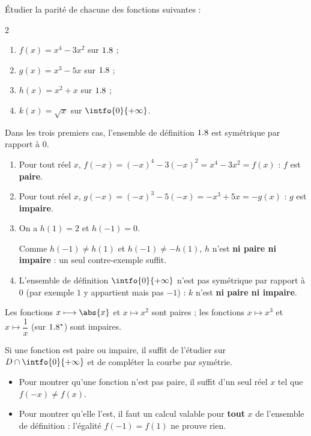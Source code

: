 \begin{methode}
	Étudier la parité de chacune des fonctions suivantes :
	\begin{multicols}{2}
		\begin{enumerate}
			\item $f(x) = x^4 - 3x^2$ sur $1.8$ ;
			\item $g(x) = x^3 - 5x$ sur $1.8$ ;
			\item $h(x) = x^2 + x$ sur $1.8$ ;
			\item $k(x) = \sqrt{x}$ sur $\intfo{0}{+\infty}$.
		\end{enumerate}
	\end{multicols}

	\begin{correction}
		Dans les trois premiers cas, l'ensemble de définition $1.8$ est symétrique par rapport à $0$.
		\begin{enumerate}
			\item Pour tout réel $x$, $f(-x) = (-x)^4 - 3(-x)^2 = x^4 - 3x^2 = f(x)$ : $f$ est \textbf{paire}.
			\item Pour tout réel $x$, $g(-x) = (-x)^3 - 5(-x) = -x^3 + 5x = -g(x)$ : $g$ est \textbf{impaire}.
			\item On a $h(1) = 2$ et $h(-1) = 0$.

			      Comme $h(-1) \neq h(1)$ et $h(-1) \neq -h(1)$, $h$ n'est \textbf{ni paire ni impaire} : un seul contre-exemple suffit.
			\item L'ensemble de définition $\intfo{0}{+\infty}$ n'est pas symétrique par rapport à $0$ (par exemple $1$ y appartient mais pas $-1$) : $k$ n'est \textbf{ni paire ni impaire}.
		\end{enumerate}
	\end{correction}
\end{methode}

\begin{rem}
	Les fonctions $x \longmapsto \abs{x}$ et $x \longmapsto x^2$ sont paires ; les fonctions $x \longmapsto x^3$ et $x \longmapsto \dfrac{1}{x}$ (sur $1.8^*$) sont impaires.

	Si une fonction est paire ou impaire, il suffit de l'étudier sur $D \cap \intfo{0}{+\infty}$ et de compléter la courbe par symétrie.
\end{rem}

\begin{attention}
	\nline
	\begin{itemize}
		\item Pour montrer qu'une fonction n'est pas paire, il suffit d'un seul réel $x$ tel que $f(-x) \neq f(x)$.
		\item Pour montrer qu'elle l'est, il faut un calcul valable pour \textbf{tout} $x$ de l'ensemble de définition : l'égalité $f(-1) = f(1)$ ne prouve rien.
	\end{itemize}
\end{attention}

